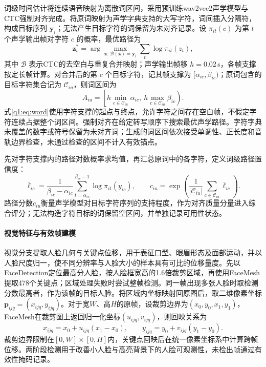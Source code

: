 词级时间估计将连续语音映射为离散词区间，采用预训练wav2vec2声学模型\cite{ref:wav2vec2}与CTC强制对齐完成。将原词映射为声学字典支持的大写字符，词间插入分隔符，构成目标序列 $\bm y_i$；无法产生目标字符的词保留为未对齐记录。设 $\pi_{it}(c)$ 为第 $t$ 个声学输出帧对字符 $c$ 的概率，最优路径为
\begin{equation}
\bm z_i^*=\arg\max_{\bm z:\,\mathcal B(\bm z)=\bm y_i}
\sum_t\log\pi_{it}(z_t),
\label{q1:eq:ctc}
\end{equation}
其中 $\mathcal B$ 表示CTC的去空白与重复合并映射；声学输出帧移 $h=0.02$\,s，各帧支撑按定长帧计算。对合并后的第 $c$ 个目标字符，记其帧支撑为 $[\alpha_{ic},\beta_{ic})$；原词包含的目标字符集合记为 $\mathcal C_{iu}$，则词区间为
\begin{equation}
A_{iu}=\left[h\min_{c\in\mathcal C_{iu}}\alpha_{ic},\ 
h\max_{c\in\mathcal C_{iu}}\beta_{ic}\right).
\label{q1:eq:word}
\end{equation}
式\eqref{q1:eq:word}使用字符支撑的起点与终点，允许字符之间存在空白帧，不假定字符连续占据整个词区间。强制对齐在给定转写顺序下搜索最优声学路径\cite{ref:ctc}。字符字典未覆盖的数字或符号保留为未对齐词；生成的词区间依次接受单调性、正长度和音轨边界检查，未通过检查的区间不计入有效锚点。

先对字符支撑内的路径对数概率求均值，再汇总原词中的各字符，定义词级路径置信度：
\begin{equation}
\bar\ell_{ic}=\frac{1}{\beta_{ic}-\alpha_{ic}}
\sum_{t=\alpha_{ic}}^{\beta_{ic}-1}\log\pi_{it}(y_{ic}),
\qquad
c_{iu}=\exp\left(\frac{1}{|\mathcal C_{iu}|}\sum_{c\in\mathcal C_{iu}}\bar\ell_{ic}\right).
\label{q1:eq:confidence}
\end{equation}
路径分数$c_{iu}$衡量声学模型对目标字符序列的支持程度，作为对齐质量分量进入综合评分；无法构造字符目标的词保留空区间，并单独记录可用性状态。

\paragraph{视觉特征与有效帧建模}

视觉分支提取人脸几何与关键点位移，用于表征口型、眼眉形态及面部运动，并以人脸尺度归一，使不同分辨率与人脸大小的样本具有可比的位移量度。先以FaceDetection定位最高分人脸，按人脸框宽高的1.6倍裁剪区域，再使用FaceMesh提取478个关键点；区域处理失败时尝试整帧检测。同一帧出现多张人脸时取检测分数最高者，作为该帧的目标人脸。将区域内坐标映射回原图后，取二维像素坐标 $\bm p_{ijq}=(x_{ijq},y_{ijq})$。对于宽$W$、高$H$的原帧，设裁剪边界为$(x_0,y_0,x_1,y_1)$，FaceMesh在裁剪图上返回归一化坐标$(u_{ijq},v_{ijq})$，则回映关系为
\begin{equation}
x_{ijq}=x_0+u_{ijq}(x_1-x_0),\qquad
y_{ijq}=y_0+v_{ijq}(y_1-y_0).
\label{q1:eq:roi-map}
\end{equation}
裁剪边界限制在$[0,W]\times[0,H]$内，关键点回映后在统一像素坐标系中计算跨帧位移。两阶段检测用于改善小人脸与高亮背景下的人脸可观测性，未检出帧通过有效性掩码记录。

